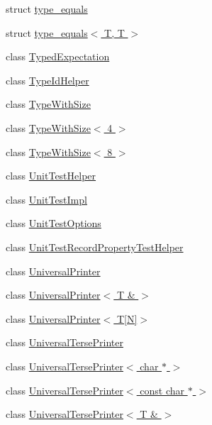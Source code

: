 \begin{DoxyCompactItemize}
struct \hyperlink{structtesting_1_1internal_1_1type__equals}{type\+\_\+equals}
\item 
struct \hyperlink{structtesting_1_1internal_1_1type__equals_3_01_t_00_01_t_01_4}{type\+\_\+equals$<$ T, T $>$}
\item 
class \hyperlink{classtesting_1_1internal_1_1_typed_expectation}{Typed\+Expectation}
\item 
class \hyperlink{classtesting_1_1internal_1_1_type_id_helper}{Type\+Id\+Helper}
\item 
class \hyperlink{classtesting_1_1internal_1_1_type_with_size}{Type\+With\+Size}
\item 
class \hyperlink{classtesting_1_1internal_1_1_type_with_size_3_014_01_4}{Type\+With\+Size$<$ 4 $>$}
\item 
class \hyperlink{classtesting_1_1internal_1_1_type_with_size_3_018_01_4}{Type\+With\+Size$<$ 8 $>$}
\item 
class \hyperlink{classtesting_1_1internal_1_1_unit_test_helper}{Unit\+Test\+Helper}
\item 
class \hyperlink{classtesting_1_1internal_1_1_unit_test_impl}{Unit\+Test\+Impl}
\item 
class \hyperlink{classtesting_1_1internal_1_1_unit_test_options}{Unit\+Test\+Options}
\item 
class \hyperlink{classtesting_1_1internal_1_1_unit_test_record_property_test_helper}{Unit\+Test\+Record\+Property\+Test\+Helper}
\item 
class \hyperlink{classtesting_1_1internal_1_1_universal_printer}{Universal\+Printer}
\item 
class \hyperlink{classtesting_1_1internal_1_1_universal_printer_3_01_t_01_6_01_4}{Universal\+Printer$<$ T \& $>$}
\item 
class \hyperlink{classtesting_1_1internal_1_1_universal_printer_3_01_t[_n]_4}{Universal\+Printer$<$ T\mbox{[}\+N\mbox{]}$>$}
\item 
class \hyperlink{classtesting_1_1internal_1_1_universal_terse_printer}{Universal\+Terse\+Printer}
\item 
class \hyperlink{classtesting_1_1internal_1_1_universal_terse_printer_3_01char_01_5_01_4}{Universal\+Terse\+Printer$<$ char $\ast$ $>$}
\item 
class \hyperlink{classtesting_1_1internal_1_1_universal_terse_printer_3_01const_01char_01_5_01_4}{Universal\+Terse\+Printer$<$ const char $\ast$ $>$}
\item 
class \hyperlink{classtesting_1_1internal_1_1_universal_terse_printer_3_01_t_01_6_01_4}{Universal\+Terse\+Printer$<$ T \& $>$}

\end{DoxyCompactItemize}
